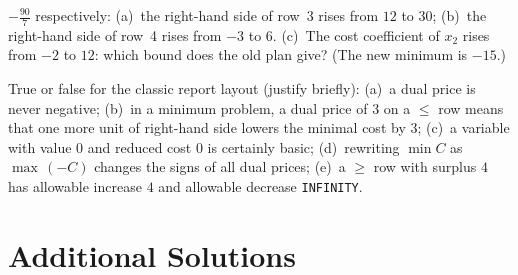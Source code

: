 \begin{problems}
        $-\tfrac{90}{7}$ respectively: (a)~the right-hand side of row~3
        rises from $12$ to $30$; (b)~the right-hand side of row~4 rises
        from $-3$ to $6$. (c)~The cost coefficient of $x_{2}$ rises from
        $-2$ to $12$: which bound does the old plan give? (The new minimum
        is $-15$.)
  \item True or false for the classic report layout (justify briefly):
        (a)~a dual price is never negative;
        (b)~in a minimum problem, a dual price of $3$ on a $\le$ row means
        that one more unit of right-hand side lowers the minimal cost by
        $3$;
        (c)~a variable with value $0$ and reduced cost $0$ is certainly
        basic;
        (d)~rewriting $\min C$ as $\max\,(-C)$ changes the signs of all
        dual prices;
        (e)~a $\ge$ row with surplus $4$ has allowable increase $4$ and
        allowable decrease \texttt{INFINITY}.
\end{problems}

\section{Additional Solutions}

